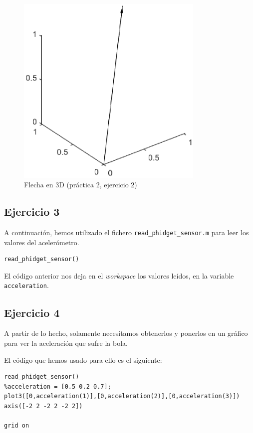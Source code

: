 \documentclass{article}
\newcommand{\sej}[1]{\subsection{Ejercicio #1}}
\begin{document}
\begin{figure}[h]
\centering
\includegraphics[width=0.8\textwidth]{practica2_ex3.eps}
\caption{Flecha en 3D (práctica 2, ejercicio 2)}
\label{fig:flecha3d}
\end{figure}

\sej{3}
A continuación, hemos utilizado el fichero {\tt read\_phidget\_sensor.m}
para leer los valores del acelerómetro.

\begin{lstlisting}[frame=single]
read_phidget_sensor()
\end{lstlisting}

El código anterior nos deja en el {\it workspace} los valores leídos, en la variable {\tt acceleration}.

\sej{4}
A partir de lo hecho, 
solamente necesitamos obtenerlos y ponerlos en un gráfico para 
ver la aceleración que sufre la bola.

El código que hemos usado para ello es el siguiente:
\begin{lstlisting}[frame=single]
read_phidget_sensor()
%acceleration = [0.5 0.2 0.7];
plot3([0,acceleration(1)],[0,acceleration(2)],[0,acceleration(3)])
axis([-2 2 -2 2 -2 2])

grid on
\end{lstlisting}
\end{document}
